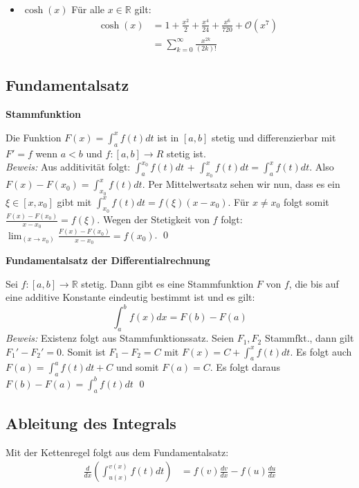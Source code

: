 \documentclass[25pt]{sciposter}
\newcommand{\R}{\mathbb{R}}
\newenvironment{method}[1]{\begin{mdframed}[backgroundcolor=blue!10,innertopmargin=15pt, innerbottommargin=15pt,nobreak=true]
		\textbf{#1 }
	}
	{ 
	\end{mdframed}
}
\begin{document}
\begin{multicols}{3}
\begin{itemize}
	\item $\boxed{\cosh(x)}$ Für alle $x\in \R$ gilt:
	\begin{align*}
	\cosh(x) &= 1 + \frac{x^2}{2} + \frac{x^4}{24} + \frac{x^6}{720} +  \mathcal{O}(x^7)\\
	&= \sum_{k=0}^{\infty}\frac{x^{2k}}{(2k)!}
	\end{align*}
	

\end{itemize}






\subsection*{Fundamentalsatz}
\begin{method}{Stammfunktion}
Die Funktion $F(x) = \int_{a}^{x} f(t) dt$ ist in $[a,b]$ stetig und differenzierbar mit $F' = f$ wenn $a<b$ und $f:[a,b]\to R$ stetig ist. \\
\textit{Beweis:} Aus additivität folgt: $\int_{a}^{x_0} f(t) dt$ + $\int_{x_0}^{x} f(t) dt = \int_{a}^{x} f(t) dt$. Also $F(x) - F(x_0) = \int_{x_0}^{x} f(t) dt$. Per Mittelwertsatz sehen wir nun, dass es ein $\xi \in [x,x_0]$ gibt mit $\int_{x_0}^{x} f(t) dt = f(\xi) (x-x_0) $. Für $x \not = x_0$ folgt somit $\frac{F(x) - F(x_0)}{x-x_0} = f(\xi)$. Wegen der Stetigkeit von $f$ folgt: $\lim_{(x\to x_0)} \frac{F(x) - F(x_0)}{x-x_0} = f(x_0)$. \qed
\end{method}


\begin{method}{Fundamentalsatz der Differentialrechnung}
Sei $f:[a,b] \to \R$ stetig. Dann gibt es eine Stammfunktion $F$ von $f$, die bis auf eine additive Konstante eindeutig bestimmt ist und es gilt:
$$\int_{a}^{b} f(x) dx = F(b) - F(a)$$
\textit{Beweis:} Existenz folgt aus Stammfunktionssatz. Seien $F_1, F_2$ Stammfkt., dann gilt $F_1' - F_2' = 0$. Somit ist $F_1 - F_2 = C$ mit $F(x) = C + \int_{a}^{x} f(t) dt$. Es folgt auch $F(a) = \int_{a}^{a} f(t) dt + C$ und somit $F(a) = C$. Es folgt daraus $F(b)-F(a) = \int_{a}^{b} f(t) dt$ \qed 
\end{method}


\subsection*{Ableitung des Integrals}
Mit der Kettenregel folgt aus dem Fundamentalsatz:
\begin{align*}
\frac{d}{dx} \left( \int_{u(x)}^{v(x)} f(t)  dt \right) &= f(v)\frac{dv}{dx} - f(u)\frac{du}{dx}
\end{align*}


\end{multicols}
\end{document}
